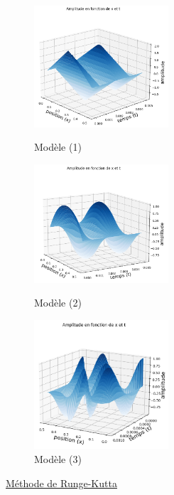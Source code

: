 \begin{figure}[H]
  \includegraphics[width=5cm]{3.png}
  \caption{Modèle (1)}\label{fig}
\endminipage\hfill
{}
  \includegraphics[width=5cm]{4.png}
  \caption{Modèle (2)}\label{fig}
\endminipage\hfill
{}%
  \includegraphics[width=5cm]{8_implicite.png}
  \caption{Modèle (3)}\label{fig}
\endminipage
\end{figure}


\underline{Méthode de Runge-Kutta}
   
